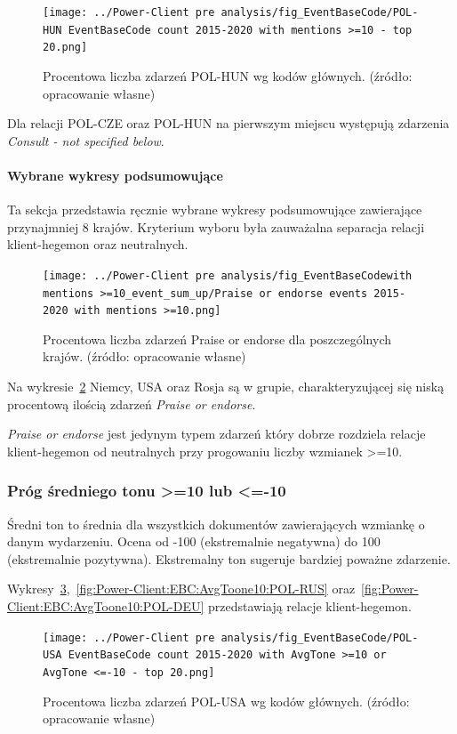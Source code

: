 \documentclass[11pt]{report}
\begin{document}
    \begin{figure}[!htp]
        \centering
        \texttt{[image: ../Power-Client pre analysis/fig\_EventBaseCode/POL-HUN EventBaseCode count 2015-2020 with mentions >=10 - top 20.png]}
        \caption{Procentowa liczba zdarzeń POL-HUN wg kodów głównych. (źródło: opracowanie własne)}
        \label{fig:Power-Client:EBC:Mentions10:POL-HUN}
    \end{figure}

    Dla relacji POL-CZE oraz POL-HUN na pierwszym miejscu występują zdarzenia \textit{Consult - not specified below}.

    \paragraph{Wybrane wykresy podsumowujące}
    Ta sekcja przedstawia ręcznie wybrane wykresy podsumowujące zawierające przynajmniej 8 krajów.
    Kryterium wyboru była zauważalna separacja relacji klient-hegemon oraz neutralnych.

    \begin{figure}[!htp]
        \centering
        \texttt{[image: ../Power-Client pre analysis/fig\_EventBaseCodewith mentions >=10\_event\_sum\_up/Praise or endorse events 2015-2020 with mentions >=10.png]}
        \caption{Procentowa liczba zdarzeń Praise or endorse dla poszczególnych krajów. (źródło: opracowanie własne)}
        \label{fig:Power-Client:ERC:Mentions10:SumUp:Praise or endorse}
    \end{figure}
    Na wykresie~\ref{fig:Power-Client:ERC:Mentions10:SumUp:Praise or endorse} Niemcy, USA oraz Rosja są w grupie,
    charakteryzującej się niską procentową ilością zdarzeń \textit{Praise or endorse}.

    \textit{Praise or endorse} jest jedynym typem zdarzeń który dobrze rozdziela relacje klient-hegemon od neutralnych
    przy progowaniu liczby wzmianek >=10.

    \subsubsection{Próg średniego tonu >=10 lub <=-10}
    Średni ton to średnia dla wszystkich dokumentów zawierających wzmiankę o danym wydarzeniu.
    Ocena od -100 (ekstremalnie negatywna) do 100 (ekstremalnie pozytywna).
    Ekstremalny ton sugeruje bardziej poważne zdarzenie.

    Wykresy~\ref{fig:Power-Client:EBC:AvgToone10:POL-USA},~\ref{fig:Power-Client:EBC:AvgToone10:POL-RUS} oraz~\ref{fig:Power-Client:EBC:AvgToone10:POL-DEU} przedstawiają relacje klient-hegemon.
    \begin{figure}[!htp]
        \centering
        \texttt{[image: ../Power-Client pre analysis/fig\_EventBaseCode/POL-USA EventBaseCode count 2015-2020 with AvgTone >=10 or AvgTone <=-10 - top 20.png]}
        \caption{Procentowa liczba zdarzeń POL-USA wg kodów głównych. (źródło: opracowanie własne)}
        \label{fig:Power-Client:EBC:AvgToone10:POL-USA}
    \end{figure}
\end{document}
